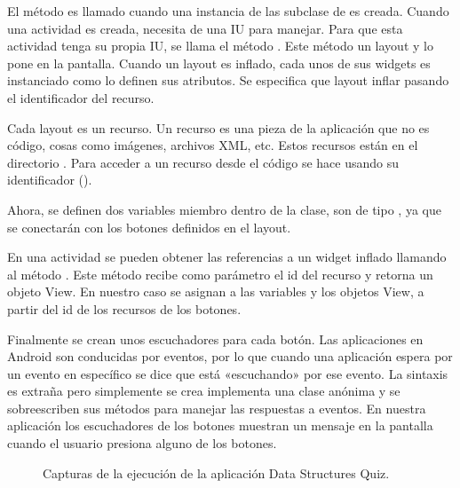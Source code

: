El método  es llamado cuando una instancia de las subclase
de  es creada. Cuando una actividad es creada, necesita de una IU para
manejar. Para que esta actividad tenga su propia IU, se llama el método
. Este método  un layout y lo pone en la pantalla.
Cuando un layout es inflado, cada unos de sus widgets es instanciado como
lo definen sus atributos. Se especifica que layout inflar pasando el identificador
del recurso.

Cada layout es un recurso. Un recurso es una pieza de la aplicación que no es
código, cosas como imágenes, archivos XML, etc. Estos recursos están en
el directorio . Para acceder a un recurso desde el código se hace
usando su identificador ().

Ahora, se definen dos variables miembro dentro de la clase, son de tipo
, ya que se conectarán con los botones definidos en el layout.

En una actividad se pueden obtener las referencias a un widget inflado llamando
al método . Este método recibe como parámetro el id del recurso
y retorna un objeto View. En nuestro caso se asignan a las variables
 y  los objetos View, a partir del id
de los recursos de los botones.

Finalmente se crean unos escuchadores para cada botón. Las aplicaciones en
Android son conducidas por eventos, por lo que cuando una aplicación espera
por un evento en específico se dice que está «escuchando» por ese evento. La
sintaxis es extraña pero simplemente se crea implementa una clase anónima
y se sobreescriben sus métodos para manejar las respuestas a eventos. En nuestra
aplicación los escuchadores de los botones muestran un mensaje en la pantalla
cuando el usuario presiona alguno de los botones.


\begin{figure}%
    \centering
    \qquad
    \caption{Capturas de la ejecución de la aplicación  Data Structures Quiz.}
    \label{fig:quiz_app}%
\end{figure}

